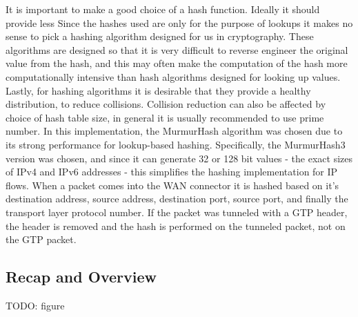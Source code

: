 It is important to make a good choice of a hash function. Ideally it should provide less Since the hashes used are only for the purpose of lookups it makes no sense to pick a hashing algorithm designed for us in cryptography. These algorithms are designed so that it is very difficult to reverse engineer the original value from the hash, and this may often make the computation of the hash more computationally intensive than hash algorithms designed for looking up values. Lastly, for hashing algorithms it is desirable that they provide a healthy distribution, to reduce collisions. Collision reduction can also be affected by choice of hash table size, in general it is usually recommended to use prime number. In this implementation, the MurmurHash algorithm was chosen due to its strong performance for lookup-based hashing. Specifically, the MurmurHash3 \cite{murmurhash3} version was chosen, and since it can generate 32 or 128 bit values - the exact sizes of IPv4 and IPv6 addresses - this simplifies the hashing implementation for IP flows. When a packet comes into the WAN connector it is hashed based on it's destination address, source address, destination port, source port, and finally the transport layer protocol number. If the packet was tunneled with a GTP header, the header is removed and the hash is performed on the tunneled packet, not on the GTP packet.

\subsection{Recap and Overview}
TODO: figure


































